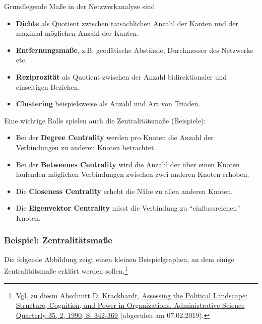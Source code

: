 Grundlegende Maße in der Netzwerkanalyse sind

\begin{itemize}
\tightlist
\item
  \textbf{Dichte} als Quotient zwischen tatsächlichen Anzahl der Kanten
  und der maximal möglichen Anzahl der Kanten.
\item
  \textbf{Entfernungsmaße}, z.B. geodätische Abstände, Durchmesser des
  Netzwerks etc.
\item
  \textbf{Reziprozität} als Quotient zwischen der Anzahl bidirektionaler
  und einseitigen Beziehen.
\item
  \textbf{Clustering} beispielsweise als Anzahl und Art von Triaden.
\end{itemize}

Eine wichtige Rolle spielen auch die Zentralitätsmaße (Beispiele):

\begin{itemize}
\tightlist
\item
  Bei der \textbf{Degree Centrality} werden pro Knoten die Anzahl der
  Verbindungen zu anderen Knoten betrachtet.
\item
  Bei der \textbf{Betweenes Centrality} wird die Anzahl der über einen
  Knoten laufenden möglichen Verbindungen zwischen zwei anderen Knoten
  erhoben.
\item
  Die \textbf{Closeness Centrality} erhebt die Nähe zu allen anderen
  Knoten.
\item
  Die \textbf{Eigenvektor Centrality} misst die Verbindung zu
  ``einflussreichen'' Knoten.
\end{itemize}

\hypertarget{beispiel-zentralituxe4tsmauxdfe}{%
\subsubsection{Beispiel:
Zentralitätsmaße}\label{beispiel-zentralituxe4tsmauxdfe}}

Die folgende Abbildung zeigt einen kleinen Beispielgraphen, an dem
einige Zentralitätsmaße erklärt werden sollen.\footnote{Vgl. zu diesm
  Abschnitt
  \href{https://www.jstor.org/stable/2393394?origin=crossref\&seq=1\#metadata_info_tab_contents}{D.
  Krackhardt, Assessing the Political Landscape: Structure, Cognition,
  and Power in Organizations. Administrative Science Quarterly 35, 2,
  1990, S. 342-369} (abgerufen am 07.02.2019).}

